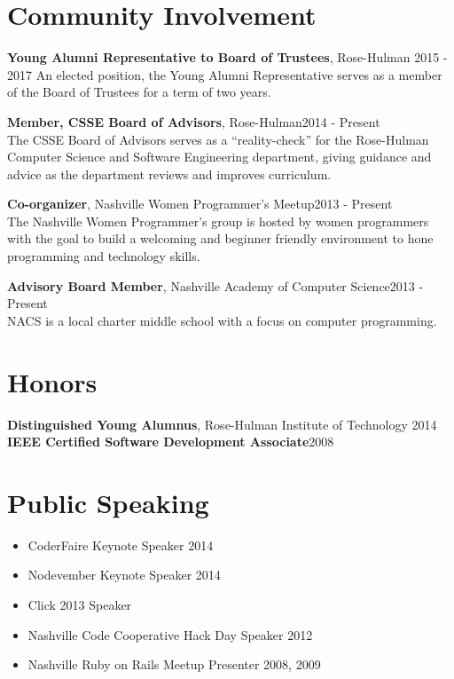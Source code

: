 \documentclass[line, margin, 10pt]{res}
\begin{document}
\begin{resume}
\section{Community Involvement}

{\bf Young Alumni Representative to Board of Trustees}, Rose-Hulman 2015 - 2017
An elected position, the Young Alumni Representative serves as a member of the Board of Trustees for a term of two years.

{\bf Member, CSSE Board of Advisors}, Rose-Hulman\hfill 2014 - Present\\
The CSSE Board of Advisors serves as a ``reality-check'' for the Rose-Hulman Computer Science and Software Engineering department, giving guidance and advice as the department reviews and improves curriculum.

{\bf Co-organizer}, Nashville Women Programmer's Meetup\hfill 2013 - Present\\
The Nashville Women Programmer's group is hosted by women programmers with the goal to build a welcoming and beginner friendly environment to hone programming and technology skills.

{\bf Advisory Board Member}, Nashville Academy of Computer Science\hfill 2013 - Present\\
NACS is a local charter middle school with a focus on computer programming.


\section{Honors}

{\bf Distinguished Young Alumnus}, Rose-Hulman Institute of Technology \hfill 2014\\
{\bf IEEE Certified Software Development Associate}\hfill 2008

\section{Public Speaking}

\begin{itemize}\itemsep -2pt
  \item CoderFaire Keynote Speaker 2014
  \item Nodevember Keynote Speaker 2014
  \item Click 2013 Speaker
  \item Nashville Code Cooperative Hack Day Speaker 2012
  \item Nashville Ruby on Rails Meetup Presenter 2008, 2009
\end{itemize}


\end{resume}
\end{document}
